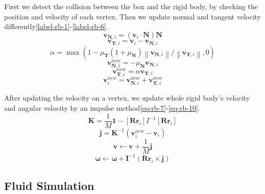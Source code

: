 First we detect the collision between the box and the rigid body, by checking the position and velocity of each vertex. Then we update normal and tangent velocity differently\eqref{label-rb-1}-\eqref{label-rb-6}.
\begin{equation}
  \label{eq-rb-1}
\mathbf{v}_{\mathbf{N},i}=(\mathbf{v}_i\cdot \mathbf{N})\mathbf{N}
\end{equation}
\begin{equation}
  \label{eq-rb-2}
\mathbf{v}_{\mathbf{T},i}=\mathbf{v}_i-\mathbf{v}_{\mathbf{N},i}
\end{equation}
\begin{equation}
  \label{eq-rb-3}
  \alpha=\max\left(1-\mu_{\mathbf{T}}(1+\mu_{\mathbf{N}})\left\lVert \mathbf{v}_{\mathbf{N},i}\right\rVert/\left\lVert \mathbf{v}_{\mathbf{T},i}\right\rVert, 0\right)
\end{equation}
\begin{equation}
  \label{eq-rb-4}
  \mathbf{v}_{\mathbf{N},i}^{new}=-\mu_{\mathbf{N}}\mathbf{v}_{\mathbf{N},i}
\end{equation}
\begin{equation}
  \label{eq-rb-5}
  \mathbf{v}_{\mathbf{T},i}^{new}=\alpha\mathbf{v}_{\mathbf{T},i}
\end{equation}
\begin{equation}
  \label{eq-rb-6}
  \mathbf{v}_i^{new}=\mathbf{v}_{\mathbf{N},i}^{new}+\mathbf{v}_{\mathbf{T},i}^{new}
\end{equation}

After updating the velocity on a vertex, we update whole rigid body's velocity and angular velocity by an impulse method\eqref{eq-rb-7}-\eqref{eq-rb-10}. 
\begin{equation}
  \label{eq-rb-7}
  \mathbf{K}=\frac{1}{M}\mathbf{1}-[\mathbf{R}\mathbf{r}_i]I^{-1}[\mathbf{R}\mathbf{r}_i]
\end{equation}
\begin{equation}
  \label{eq-rb-8}
  \mathbf{j}=\mathbf{K}^{-1}(\mathbf{v}_i^{new}-\mathbf{v}_i)
\end{equation}
\begin{equation}
  \label{eq-rb-9}
  \mathbf{v}\leftarrow \mathbf{v}+\frac{1}{M}\mathbf{j}
\end{equation}
\begin{equation}
  \label{eq-rb-10}
  \mathbf{\omega}\leftarrow \mathbf{\omega}+\mathbf{I}^{-1}(\mathbf{R}\mathbf{r}_i\times \mathbf{j})
\end{equation}

\subsection{Fluid Simulation}

